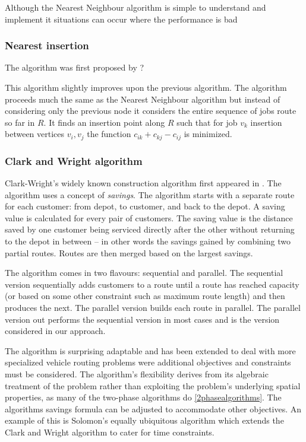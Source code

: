 Although the Nearest Neighbour algorithm is simple to understand and implement it situations can occur where the performance is bad

\subsubsection{Nearest insertion}

The algorithm was first proposed by ?

This algorithm slightly improves upon the previous algorithm. The algorithm proceeds much the same as the Nearest Neighbour algorithm but instead of considering only the previous node it considers the entire sequence of jobs route so far in $R$. It finds an insertion point along $R$ such that for job $v_k$ insertion between vertices $v_i, v_j$ the function $c_{ik} + c_{kj} - c_{ij}$ is minimized.

\subsubsection{Clark and Wright algorithm}

Clark-Wright's widely known construction algorithm first appeared in \cite{clark:1964}. The algorithm uses a concept of \emph{savings}. The algorithm starts with a separate route for each customer: from depot, to customer, and back to the depot. A saving value is calculated for every pair of customers. The saving value is the distance saved by one customer being serviced directly after the other without returning to the depot in between -- in other words the savings gained by combining two partial routes. Routes are then merged based on the largest savings.

The algorithm comes in two flavours: sequential and parallel. The sequential version sequentially adds customers to a route until a route has reached capacity (or based on some other constraint such as maximum route length) and then produces the next. The parallel version builds each route in parallel. The parallel version out performs the sequential version in most cases\cite{Laporte:1999} and is the version considered in our approach.

The algorithm is surprising adaptable and has been extended to deal with more specialized vehicle routing problems were additional objectives and constraints must be considered. The algorithm's flexibility derives from its algebraic treatment of the problem rather than exploiting the problem's underlying spatial properties, as many of the two-phase algorithms do \ref{2phasealgorithms}. The algorithms savings formula can be adjusted to accommodate other objectives. An example of this is Solomon's equally ubiquitous algorithm \cite{Solomon:1987} which extends the Clark and Wright algorithm to cater for time constraints. 

